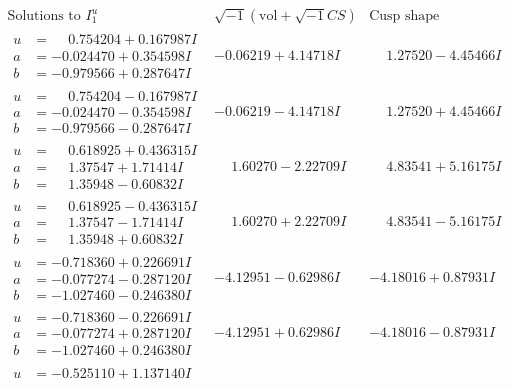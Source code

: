 \documentclass[1p]{elsarticle_modified}
\theoremstyle{definition}
\newcommand{\I}{\sqrt{-1}}
\begin{document}
$$\begin{array}{c|c|c}
\text{Solutions to }I^u_{1}& \I (\text{vol} + \sqrt{-1}CS) & \text{Cusp shape}\\
 \hline 
\begin{aligned}
u &= \phantom{-}0.754204 + 0.167987 I \\
a &= -0.024470 + 0.354598 I \\
b &= -0.979566 + 0.287647 I\end{aligned}
 & -0.06219 + 4.14718 I & \phantom{-}1.27520 - 4.45466 I \\ \hline\begin{aligned}
u &= \phantom{-}0.754204 - 0.167987 I \\
a &= -0.024470 - 0.354598 I \\
b &= -0.979566 - 0.287647 I\end{aligned}
 & -0.06219 - 4.14718 I & \phantom{-}1.27520 + 4.45466 I \\ \hline\begin{aligned}
u &= \phantom{-}0.618925 + 0.436315 I \\
a &= \phantom{-}1.37547 + 1.71414 I \\
b &= \phantom{-}1.35948 - 0.60832 I\end{aligned}
 & \phantom{-}1.60270 - 2.22709 I & \phantom{-}4.83541 + 5.16175 I \\ \hline\begin{aligned}
u &= \phantom{-}0.618925 - 0.436315 I \\
a &= \phantom{-}1.37547 - 1.71414 I \\
b &= \phantom{-}1.35948 + 0.60832 I\end{aligned}
 & \phantom{-}1.60270 + 2.22709 I & \phantom{-}4.83541 - 5.16175 I \\ \hline\begin{aligned}
u &= -0.718360 + 0.226691 I \\
a &= -0.077274 - 0.287120 I \\
b &= -1.027460 - 0.246380 I\end{aligned}
 & -4.12951 - 0.62986 I & -4.18016 + 0.87931 I \\ \hline\begin{aligned}
u &= -0.718360 - 0.226691 I \\
a &= -0.077274 + 0.287120 I \\
b &= -1.027460 + 0.246380 I\end{aligned}
 & -4.12951 + 0.62986 I & -4.18016 - 0.87931 I \\ \hline\begin{aligned}
u &= -0.525110 + 1.137140 I \\

\end{aligned}
\end{array}$$
\end{document}
